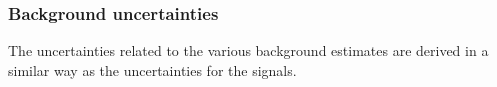 
\subsubsection{Background uncertainties}
The uncertainties related to the various background estimates are derived in a similar way as the uncertainties for the signals.  
